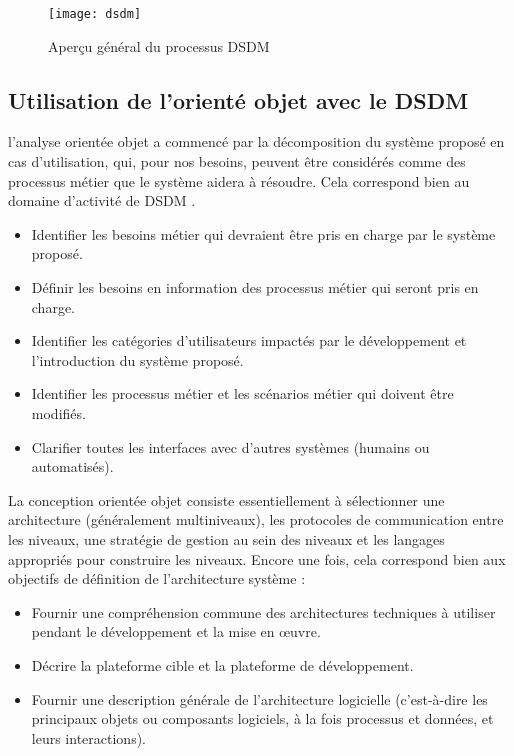 \begin{figure}[H]
	\texttt{[image: dsdm]}
	\caption{Aperçu général du processus DSDM\cite{the_dsdm_consortium_dsdm}}
\end{figure}


\subsection{Utilisation de l'orienté objet avec le DSDM}
l'analyse orientée objet a commencé par la décomposition du système proposé en cas d'utilisation, qui, pour nos besoins, peuvent être considérés comme des processus métier que le système aidera à résoudre. Cela correspond bien au domaine d'activité de DSDM \cite{the_dsdm_consortium_dsdm}.

\begin{itemize}
	\item Identifier les besoins métier qui devraient être pris en charge par le système proposé.
	\item Définir les besoins en information des processus métier qui seront pris en charge.
	\item Identifier les catégories d'utilisateurs impactés par le développement et l'introduction du système proposé.
	\item Identifier les processus métier et les scénarios métier qui doivent être modifiés.
	\item Clarifier toutes les interfaces avec d'autres systèmes (humains ou automatisés).
	
\end{itemize}

La conception orientée objet consiste essentiellement à sélectionner une architecture (généralement multiniveaux), les protocoles de communication entre les niveaux, une stratégie de gestion au sein des niveaux et les langages appropriés pour construire les niveaux. Encore une fois, cela correspond bien aux objectifs de définition de l'architecture système :

\begin{itemize}
	\item Fournir une compréhension commune des architectures techniques à utiliser pendant le développement et la mise en œuvre.
	\item Décrire la plateforme cible et la plateforme de développement.
	\item Fournir une description générale de l'architecture logicielle (c'est-à-dire les principaux objets ou composants logiciels, à la fois processus et données, et leurs interactions).
\end{itemize}

